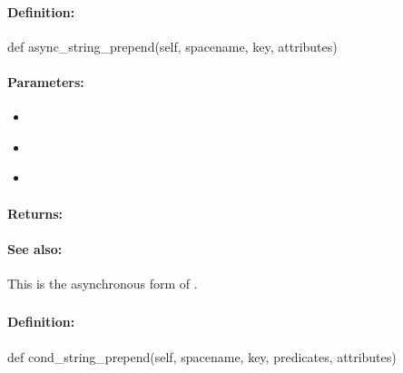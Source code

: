 \paragraph{Definition:}
\begin{pythoncode}
def async_string_prepend(self, spacename, key, attributes)
\end{pythoncode}

\paragraph{Parameters:}
\begin{itemize}[noitemsep]
\item {}\\

\item {}\\

\item {}\\

\end{itemize}

\paragraph{Returns:}


\paragraph{See also:}  This is the asynchronous form of .

\pagebreak
\subsubsection{}
\label{api:python:cond_string_prepend}


\paragraph{Definition:}
\begin{pythoncode}
def cond_string_prepend(self, spacename, key, predicates, attributes)
\end{pythoncode}


